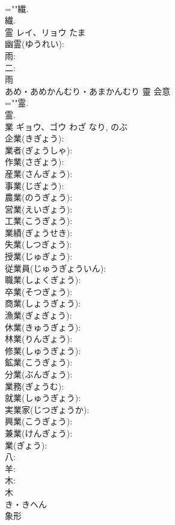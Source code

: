 \documentclass[8pt]{extreport}
\begin{document}
\begin{CJK}{UTF8}{min}
\\	=""繊.
\\	繊.
\\	霊	レイ、リョウ	たま		
\\	幽霊(ゆうれい): 
\\	雨: 
\\	二: 
\\	雨	
\\	あめ・あめかんむり・あまかんむり	靈	会意 
\\	=""霊.
\\	霊.
\\	業	ギョウ、ゴウ	わざ	なり, のぶ	
\\	企業(きぎょう): 
\\	業者(ぎょうしゃ): 
\\	作業(さぎょう): 
\\	産業(さんぎょう): 
\\	事業(じぎょう): 
\\	農業(のうぎょう): 
\\	営業(えいぎょう): 
\\	工業(こうぎょう): 
\\	業績(ぎょうせき): 
\\	失業(しつぎょう): 
\\	授業(じゅぎょう): 
\\	従業員(じゅうぎょういん): 
\\	職業(しょくぎょう): 
\\	卒業(そつぎょう): 
\\	商業(しょうぎょう): 
\\	漁業(ぎょぎょう): 
\\	休業(きゅうぎょう): 
\\	林業(りんぎょう): 
\\	修業(しゅうぎょう): 
\\	鉱業(こうぎょう): 
\\	分業(ぶんぎょう): 
\\	業務(ぎょうむ): 
\\	就業(しゅうぎょう): 
\\	実業家(じつぎょうか): 
\\	興業(こうぎょう): 
\\	兼業(けんぎょう): 
\\	業(ぎょう): 
\\	八: 
\\	羊: 
\\	木: 
\\	木	
\\	き・きへん	
\\	象形 

\end{CJK}
\end{document}
